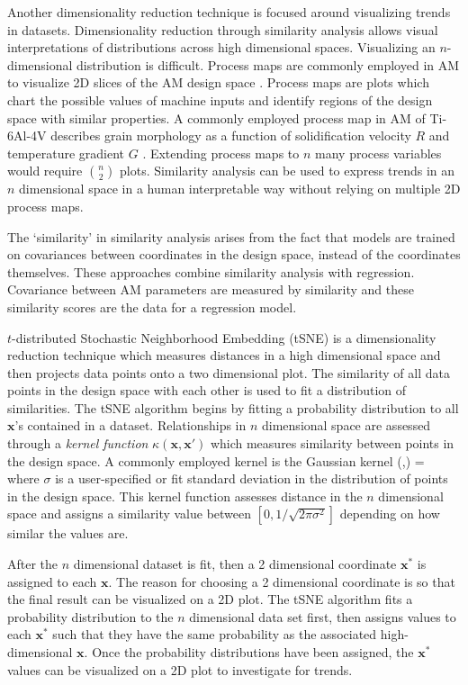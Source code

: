 Another dimensionality reduction technique is focused around visualizing trends in datasets. Dimensionality reduction through similarity analysis allows visual interpretations of distributions across high dimensional spaces. Visualizing an $n$-dimensional distribution is difficult. Process maps are commonly employed in AM to visualize 2D slices of the AM design space \cite{Beuth2001}. Process maps are plots which chart the possible values of machine inputs and identify regions of the design space with similar properties. A commonly employed process map in AM of Ti-6Al-4V describes grain morphology as a function of solidification velocity $R$ and temperature gradient $G$ \cite{DeHoff2015}. Extending process maps to $n$ many process variables would require ${n \choose 2}$ plots. Similarity analysis can be used to express trends in an $n$ dimensional space in a human interpretable way without relying on multiple 2D process maps. 

The `similarity' in similarity analysis arises from the fact that models are trained on covariances between coordinates in the design space, instead of the coordinates themselves. These approaches combine similarity analysis with regression. Covariance between AM parameters are measured by similarity and these similarity scores are the data for a regression model. 

$t$-distributed Stochastic Neighborhood Embedding (tSNE) is a dimensionality reduction technique which measures distances in a high dimensional space and then projects data points onto a two dimensional plot. The similarity of all data points in the design space with each other is used to fit a distribution of similarities. The tSNE algorithm begins by fitting a probability distribution to all $\mathbf{x}$'s contained in a dataset. Relationships in $n$ dimensional space are assessed through a \textit{kernel function} $\kappa(\mathbf{x},\mathbf{x'})$ which measures similarity between points in the design space. A commonly employed kernel is the Gaussian kernel
\eqn
	\kappa(,) = 
	\label{gausskernel}
\equ 
where $\sigma$ is a user-specified or fit standard deviation in the distribution of points in the design space. This kernel function assesses distance in the $n$ dimensional space and assigns a similarity value between $\left[0, 1/\sqrt{2\pi\sigma^2}\right]$ depending on how similar the values are. 

 After the $n$ dimensional dataset is fit, then a 2 dimensional coordinate $\mathbf{x}^*$ is assigned to each $\mathbf{x}$. The reason for choosing a 2 dimensional coordinate is so that the final result can be visualized on a 2D plot. The tSNE algorithm fits a probability distribution to the $n$ dimensional data set first, then assigns values to each $\mathbf{x}^*$ such that they have the same probability as the associated high-dimensional $\mathbf{x}$. Once the probability distributions have been assigned, the $\mathbf{x}^*$ values can be visualized on a 2D plot to investigate for trends.

